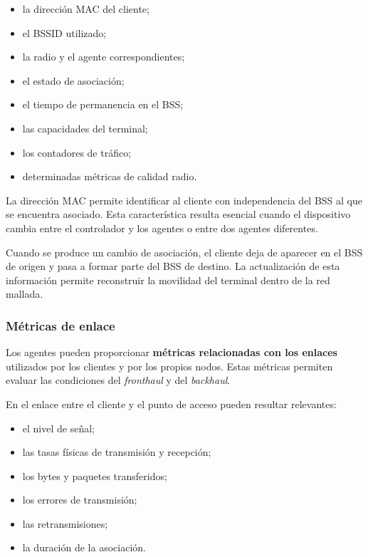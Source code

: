 \begin{itemize}
    \item la dirección MAC del cliente;
    \item el BSSID utilizado;
    \item la radio y el agente correspondientes;
    \item el estado de asociación;
    \item el tiempo de permanencia en el BSS;
    \item las capacidades del terminal;
    \item los contadores de tráfico;
    \item determinadas métricas de calidad radio.
\end{itemize}

La dirección MAC permite identificar al cliente con independencia del
BSS al que se encuentra asociado. Esta característica resulta esencial
cuando el dispositivo cambia entre el controlador y los agentes o entre
dos agentes diferentes.

Cuando se produce un cambio de asociación, el cliente deja de aparecer
en el BSS de origen y pasa a formar parte del BSS de destino. La
actualización de esta información permite reconstruir la movilidad del
terminal dentro de la red mallada.


\subsubsection*{Métricas de enlace}

Los agentes pueden proporcionar
\textbf{métricas relacionadas con los enlaces} utilizados por los
clientes y por los propios nodos. Estas métricas permiten evaluar las
condiciones del \textit{fronthaul} y del \textit{backhaul}.

En el enlace entre el cliente y el punto de acceso pueden resultar
relevantes:

\begin{itemize}
    \item el nivel de señal;
    \item las tasas físicas de transmisión y recepción;
    \item los bytes y paquetes transferidos;
    \item los errores de transmisión;
    \item las retransmisiones;
    \item la duración de la asociación.
\end{itemize}

